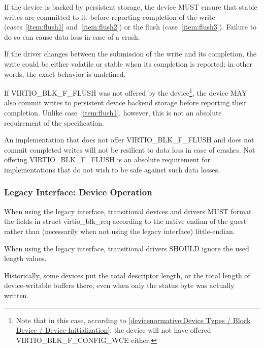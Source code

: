 If the device is backed by persistent storage, the device MUST ensure that
stable writes are committed to it, before reporting completion of the write
(cases~\ref{item:flush1} and~\ref{item:flush2}) or the flush
(case~\ref{item:flush3}).  Failure to do so can cause data loss
in case of a crash.

If the driver changes  between the submission of the write
and its completion, the write could be either volatile or stable when
its completion is reported; in other words, the exact behavior is undefined.

%

If VIRTIO_BLK_F_FLUSH was not offered by the
  device\footnote{Note that in this case, according to
  \ref{devicenormative:Device Types / Block Device / Device Initialization},
  the device will not have offered VIRTIO_BLK_F_CONFIG_WCE either.}, the
device MAY also commit writes to persistent device backend storage before
reporting their completion.  Unlike case~\ref{item:flush1}, however, this
is not an absolute requirement of the specification.

\begin{note}
  An implementation that does not offer VIRTIO_BLK_F_FLUSH and does not commit
  completed writes will not be resilient to data loss in case of crashes.
  Not offering VIRTIO_BLK_F_FLUSH is an absolute requirement
  for implementations that do not wish to be safe against such data losses.
\end{note}

\subsubsection{Legacy Interface: Device Operation}\label{sec:Device Types / Block Device / Device Operation / Legacy Interface: Device Operation}
When using the legacy interface, transitional devices and drivers
MUST format the fields in struct virtio_blk_req
according to the native endian of the guest rather than
(necessarily when not using the legacy interface) little-endian.

When using the legacy interface, transitional drivers
SHOULD ignore the used length values.
\begin{note}
Historically, some devices put the total descriptor length,
or the total length of device-writable buffers there,
even when only the status byte was actually written.
\end{note}

